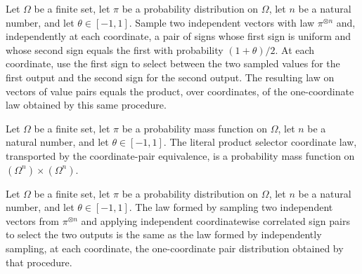 \begin{theorem}
\label{FABL.literalProductSelectorCoordinatePMF_eq_product}
\leanok
{}
Let $\Omega$ be a finite set, let $\pi$ be a probability distribution on $\Omega$, let
$n$ be a natural number, and let $\theta\in[-1,1]$. Sample two independent vectors with
law $\pi^{\otimes n}$ and, independently at each coordinate, a pair of signs whose first
sign is uniform and whose second sign equals the first with probability $(1+\theta)/2$.
At each coordinate, use the first sign to select between the two sampled values for the
first output and the second sign for the second output. The resulting law on vectors of
value pairs equals the product, over coordinates, of the one-coordinate law obtained by
this same procedure.
\end{theorem}

\begin{definition}
\label{FABL.literalProductSelectorPairPMF}
\leanok
{}
Let $Ω$ be a finite set, let $π$ be a probability mass function on $Ω$, let $n$ be a
natural number, and let $θ\in[-1,1]$. The literal product selector coordinate law,
transported by the coordinate-pair equivalence, is a probability mass function on
$(Ω^n)\times(Ω^n)$.
\end{definition}

\begin{theorem}
\label{FABL.literalProductSelectorPairPMF_eq_productSelectorPairPMF}
\leanok
{}
Let $\Omega$ be a finite set, let $\pi$ be a probability distribution on $\Omega$, let
$n$ be a natural number, and let $\theta\in[-1,1]$. The law formed by sampling two
independent vectors from $\pi^{\otimes n}$ and applying independent coordinatewise
correlated sign pairs to select the two outputs is the same as the law formed by
independently sampling, at each coordinate, the one-coordinate pair distribution
obtained by that procedure.
\end{theorem}

